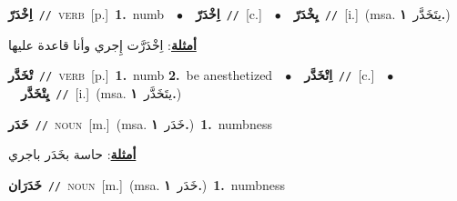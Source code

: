 \documentclass[10pt,a4paper,twoside]{article} %
\begin{document}
\begin{multicols}{2}
{\setlength\topsep{0pt}\textbf{\foreignlanguage{arabic}{اِخْدَرّ}}\ {\color{gray}\texttt{//}\color{black}}\ \textsc{verb}\ [p.]\ \textbf{1.}~numb\ \ $\bullet$\ \ \setlength\topsep{0pt}\textbf{\foreignlanguage{arabic}{اِخْدَرّ}}\ {\color{gray}\texttt{//}\color{black}}\ [c.]\ \ $\bullet$\ \ \setlength\topsep{0pt}\textbf{\foreignlanguage{arabic}{يِخْدَرّ}}\ {\color{gray}\texttt{//}\color{black}}\ [i.]\ \color{gray}(msa. \foreignlanguage{arabic}{يتَخَدَّر}~\foreignlanguage{arabic}{\textbf{١.}})\color{black}\  \begin{flushright}\color{gray}\foreignlanguage{arabic}{\textbf{\underline{\foreignlanguage{arabic}{أمثلة}}}: اِخْدَرَّت إِجري وأنا قاعدة عليها}\end{flushright}\color{black}} \vspace{2mm}

{\setlength\topsep{0pt}\textbf{\foreignlanguage{arabic}{تْخَدَّر}}\ {\color{gray}\texttt{//}\color{black}}\ \textsc{verb}\ [p.]\ \textbf{1.}~numb  \textbf{2.}~be anesthetized\ \ $\bullet$\ \ \setlength\topsep{0pt}\textbf{\foreignlanguage{arabic}{اِتْخَدَّر}}\ {\color{gray}\texttt{//}\color{black}}\ [c.]\ \ $\bullet$\ \ \setlength\topsep{0pt}\textbf{\foreignlanguage{arabic}{يِتْخَدَّر}}\ {\color{gray}\texttt{//}\color{black}}\ [i.]\ \color{gray}(msa. \foreignlanguage{arabic}{يتَخَدَّر}~\foreignlanguage{arabic}{\textbf{١.}})\color{black}\ } \vspace{2mm}

{\setlength\topsep{0pt}\textbf{\foreignlanguage{arabic}{خَدَر}}\ {\color{gray}\texttt{//}\color{black}}\ \textsc{noun}\ [m.]\ \color{gray}(msa. \foreignlanguage{arabic}{خَدَر}~\foreignlanguage{arabic}{\textbf{١.}})\color{black}\ \textbf{1.}~numbness\  \begin{flushright}\color{gray}\foreignlanguage{arabic}{\textbf{\underline{\foreignlanguage{arabic}{أمثلة}}}: حاسة بخَدَر باجري}\end{flushright}\color{black}} \vspace{2mm}

{\setlength\topsep{0pt}\textbf{\foreignlanguage{arabic}{خَدَرَان}}\ {\color{gray}\texttt{//}\color{black}}\ \textsc{noun}\ [m.]\ \color{gray}(msa. \foreignlanguage{arabic}{خَدَر}~\foreignlanguage{arabic}{\textbf{١.}})\color{black}\ \textbf{1.}~numbness\ } \vspace{2mm}


\end{multicols}
\end{document}
